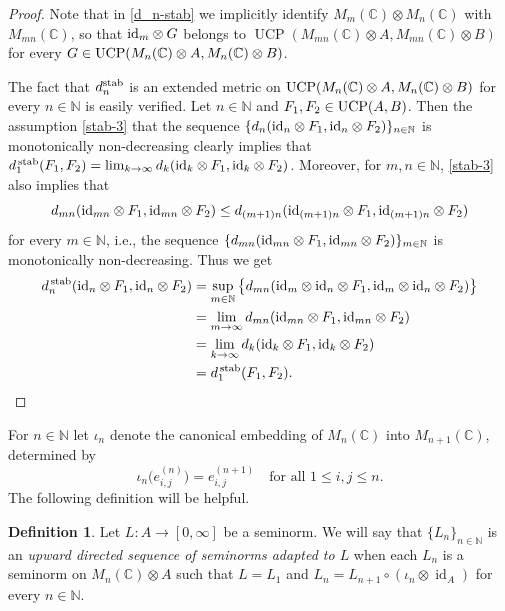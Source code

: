 \documentclass[11pt, a4paper, oneside, final, reqno]{amsart}
\newcommand{\bbN}{\mathbb{N}}
\newcommand{\bbC}{\mathbb{C}}
\newcommand{\UCP}{\operatorname{UCP}}
\newcommand{\id}{\operatorname{id}}
\theoremstyle{definition}
\newtheorem{definition}{Definition}[section]
\theoremstyle{plain}
\theoremstyle{remark}
\numberwithin{equation}{section}
\begin{document}
\begin{proof}
    Note that in \eqref{d_n-stab} we implicitly identify $M_m(\bbC)\otimes M_n(\bbC)$ with $M_{mn}(\bbC)$, so that ${\rm id}_{m} \otimes G$ belongs to $\UCP(M_{mn}(\bbC)\otimes A, M_{mn}(\bbC)\otimes B)$ for every $G \in {\rm UCP}(M_n(\bbC)\otimes A, M_n(\bbC)\otimes B)$.

    The fact that $d^{\rm stab}_{n}$ is an extended metric on ${\rm UCP}(M_n(\bbC)\otimes A, M_n(\bbC)\otimes B)$ for every $n\in \bbN$ is easily verified. Let $n\in \bbN$ and $F_1, F_2\in{\rm UCP}(A, B)$. Then the assumption \eqref{stab-3} that  the sequence $\{d_{n}({\rm id}_{n}\otimes F_1, {\rm id}_{n}\otimes F_2)\}_{n\in \bbN}$ is monotonically non-decreasing clearly implies that $d_1^{\, \rm stab}(F_1, F_2) = \lim_{k\to \infty}d_{k}({\rm id}_{k}\otimes F_1, {\rm id}_{k}\otimes F_2)$. Moreover, for $m, n \in \bbN$, \eqref{stab-3} also implies that
    \begin{equation*}
        d_{mn}({\rm id}_{mn}\otimes F_1, {\rm id}_{mn}\otimes F_2) \leq d_{(m+1)n}({\rm id}_{(m+1)n}\otimes F_1, {\rm id}_{(m+1)n}\otimes F_2)
    \end{equation*}
    for every $m\in \bbN$, i.e., the sequence $\{d_{mn}({\rm id}_{mn}\otimes F_1, {\rm id}_{mn}\otimes F_2)\}_{m\in \bbN}$ is monotonically non-decreasing. Thus we get
    \begin{align*}
        d^{\, \rm stab}_n({\rm id}_{n}\otimes F_1, {\rm id}_{n}\otimes F_2)
        & = \sup_{m\in \bbN} \big\{ d_{mn}({\rm id}_{m} \otimes{\rm id}_{n} \otimes F_1, {\rm id}_m \otimes {\rm id}_{n} \otimes F_2)\big\}\\
        & = \lim_{m\to \infty} d_{mn}({\rm id}_{mn} \otimes F_1, {\rm id}_{mn} \otimes F_2)\\
        & = \lim_{k\to \infty} d_{k}({\rm id}_{k} \otimes F_1, {\rm id}_{k} \otimes F_2)\\
        & = d_1^{\, \rm stab}(F_1, F_2). \qedhere
    \end{align*}
\end{proof}

For $n\in \bbN$ let $\iota_n$ denote the canonical embedding of $M_n(\bbC)$ into $M_{n+1}(\bbC)$, determined by
\begin{equation*}
    \iota_n\big(e_{i,j}^{(n)} \big) = e_{i,j}^{(n+1)} \quad \text{for all } 1\leq i, j\leq n.
\end{equation*}
The following definition will be helpful.

\begin{definition}
    Let $L:A\to [0, \infty]$  be a seminorm.  We will say that  $\{L_n\}_{n\in \bbN}$ is an \emph{upward directed sequence of seminorms adapted to $L$} when each $L_n$ is a seminorm on $M_n(\bbC)\otimes A$ such that $L=L_1$ and $L_n = L_{n+1}\circ (\iota_n\otimes \id_A)$ for every $n\in \bbN$.
\end{definition}
\end{document}
